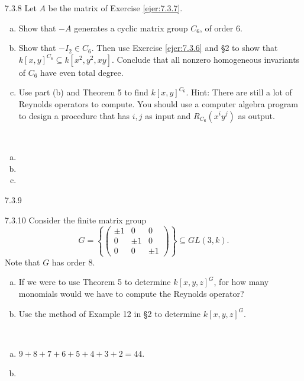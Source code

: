 \documentclass[twoside]{article}
\begin{document}
\begin{ejercicio}{7.3.8}
Let $A$ be the matrix of Exercise \ref{ejer:7.3.7}.
\begin{enumerate}[a.]
\item Show that $−A$ generates a cyclic matrix group $C_6$, of order 6.
\item Show that $−I_2 ∈ C_6$. Then use Exercise \ref{ejer:7.3.6} and §2 to show that $k[x, y]^{C_6} ⊆ k[x^2, y^2, xy]$.
Conclude that all nonzero homogeneous invariants of $C_6$ have even total degree.
\item Use part (b) and Theorem 5 to find $k[x, y]^{C_6}$. Hint: There are still a lot of Reynolds
operators to compute. You should use a computer algebra program to design a procedure
that has $i, j$ as input and $R_{C_6} (x^iy^j)$ as output.
\end{enumerate}
\end{ejercicio}
\begin{solucion}\
\begin{enumerate}[a.]
\item 
\item 
\item
\end{enumerate}
\end{solucion}

\newpage

\begin{ejercicio}{7.3.9}

\end{ejercicio}
\begin{solucion}
\end{solucion}
\newpage

\begin{ejercicio}{7.3.10}
Consider the finite matrix group
\[
G =
\left\{\begin{pmatrix}
±1& 0 &0\\
0 &±1 &0\\
0 &0 &±1
\end{pmatrix}
\right\}
⊆ GL(3, k).
\]
Note that $G$ has order 8.
\begin{enumerate}[a.]
\item If we were to use Theorem 5 to determine $k[x, y, z]^G$, for how many monomials would
we have to compute the Reynolds operator?
\item Use the method of Example 12 in §2 to determine $k[x, y, z]^G$.
\end{enumerate}
 
\end{ejercicio}
\begin{solucion}\
\begin{enumerate}[a.]
\item $9+8+7+6+5+4+3+2=44$. 
\item 
\end{enumerate}
\end{solucion}
\newpage
\end{document}
